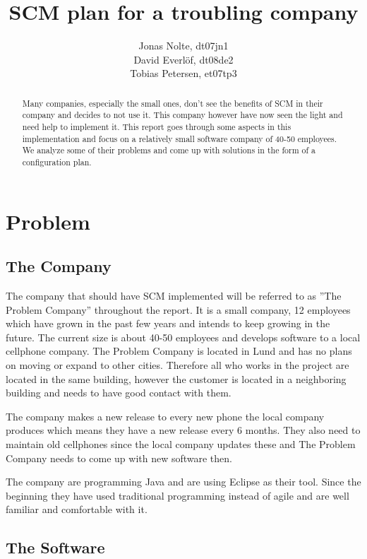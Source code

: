 \documentclass[a4paper,11pt]{article}
\title{SCM plan for a troubling company}
\author{Jonas Nolte, dt07jn1\\
David Everlöf, dt08de2\\
Tobias Petersen, et07tp3}
\begin{document}
\maketitle

\begin{abstract}
Many companies, especially the small ones, don't see the benefits of SCM in their company and decides to not use it.
This company however have now seen the light and need help to implement it.
This report goes through some aspects in this implementation and focus on a relatively small software company of 40-50 employees.
We analyze some of their problems and come up with solutions in the form of a configuration plan.
\end{abstract}
\newpage

\tableofcontents
\newpage

\section{Problem}

\subsection{The Company}

The company that should have SCM implemented will be referred to as ''The
Problem Company'' throughout the report. It is a small company, 12 employees
which have grown in the past few years and intends to keep growing in the
future. The current size is about 40-50 employees and develops software to a
local cellphone company. The Problem Company is located in Lund and has no plans
on moving or expand to other cities. Therefore all who works in the project are
located in the same building, however the customer is located in a neighboring
building and needs to have good contact with them.

The company makes a new release to every new phone the local company produces
which means they have a new release every 6 months. They also need to maintain
old cellphones since the local company updates these and The Problem Company
needs to come up with new software then.

The company are programming Java and are using Eclipse as their tool. Since the
beginning they have used traditional programming instead of agile and are well
familiar and comfortable with it.

\subsection{The Software}
\end{document}
